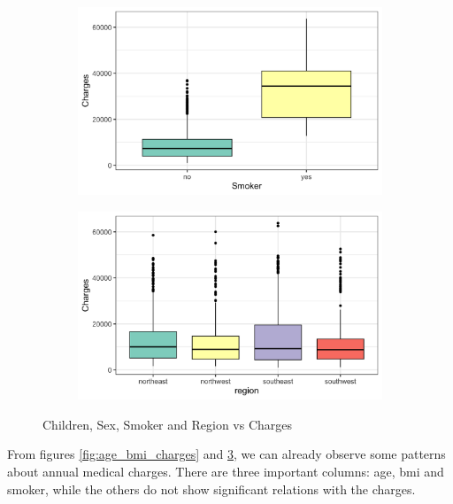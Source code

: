 \documentclass{article}
\begin{document}
\begin{figure}[!ht]
	\begin{subfigure}{0.45\textwidth}
		\centering
		\includegraphics[width=\linewidth]{images/smoker_charges.png}
		\label{fig:smoker_charges}
	\end{subfigure}
	\hspace{0.05\textwidth} %
	\begin{subfigure}{0.45\textwidth}
		\centering
		\includegraphics[width=\linewidth]{images/region_charges.png}
		\label{fig:region_charges}
	\end{subfigure}
	
	\caption{Children, Sex, Smoker and Region vs Charges}
	\label{fig:children_sex_smoker_region_charges}
\end{figure}
From figures \ref{fig:age_bmi_charges} and \ref{fig:children_sex_smoker_region_charges}, we can already observe some patterns about annual medical charges. There are three important columns: age, bmi and smoker, while the others do not show significant relations with the charges.
\end{document}
